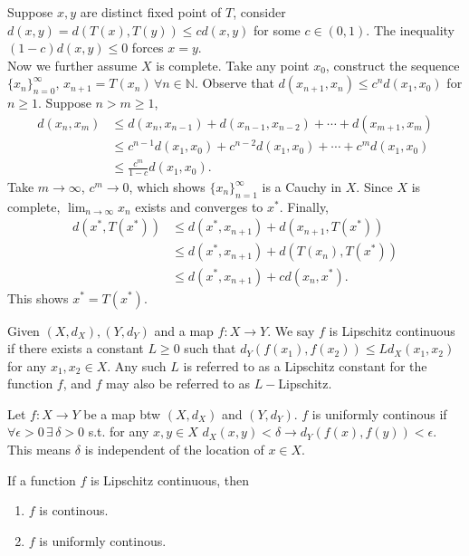 \begin{pfbox}

Suppose $x,y$ are distinct fixed point of $T$,
consider $d(x,y)=d(T(x),T(y))\le cd(x,y)$ for some $c\in (0,1).$ 
The inequality $(1-c)d(x,y)\le 0$ forces $x=y.$\\
Now we further assume $X$ is complete. Take any point $x_0$, construct the sequence $\{x_n\}^\infty_{n=0},\, x_{n+1}=T(x_n)\,\forall n\in\mathbb{N}.$
Observe that $d(x_{n+1}, x_n)\le c^n d(x_1,x_0)$ for $n\ge 1$.
Suppose $n > m \ge 1$,
\begin{align*}
    d(x_n, x_m) &\le d(x_n, x_{n-1}) + d(x_{n-1}, x_{n-2}) + \cdots + d(x_{m+1}, x_m)\\
    &\le c^{n-1} d(x_1, x_0) + c^{n-2} d(x_1, x_0) + \cdots + c^m d(x_1, x_0) \\
    &\le \frac{c^m}{1-c}d(x_1, x_0).
\end{align*}
Take $m \to \infty$, $c^m \to 0$, which shows $\{x_n\}_{n=1}^\infty$ is a Cauchy in $X$. Since $X$ is complete, $\lim_{n \to \infty} x_n$ exists and converges to $x^*$.
Finally,
\begin{align*}
    d(x^*, T(x^*)) &\le d(x^*, x_{n+1}) + d(x_{n+1}, T(x^*)) \\
    &\le  d(x^*, x_{n+1}) + d(T(x_n), T(x^*))\\
    &\le d(x^*, x_{n+1}) + cd(x_n, x^*). 
\end{align*}
This shows $x^*=T(x^*).$

\end{pfbox}


\begin{definition}
    Given $(X,d_X), (Y,d_Y)$ and a map $f:X\to Y.$
    We say $f$ is Lipschitz continuous if there exists a constant $L\ge 0$ such that
    $d_Y(f(x_1),f(x_2))\le Ld_X(x_1,x_2)$ for any $x_1,x_2\in X.$
    Any such $L$ is referred to as a Lipschitz constant for the function $f$, 
    and $f$ may also be referred to as $L-$Lipschitz.
\end{definition}

\begin{definition}
    Let $f: X\rightarrow Y$ be a map btw $(X,d_X)$ and $(Y,d_Y)$.
    $f$ is uniformly continous if $\forall \epsilon>0\,\exists\,\delta>0$ s.t. for any $x,y\in X$ $d_X(x,y)<\delta\rightarrow d_Y(f(x),f(y))<\epsilon.$
    This means $\delta$ is independent of the location of $x\in X$.
\end{definition}

\begin{theorem}
    If a function $f$ is Lipschitz continuous, then
    \begin{enumerate}
        \item $f$ is continous.
        \item $f$ is uniformly continous.
    \end{enumerate}
\label{lip_conti implies conti and uniform conti}
\end{theorem}

